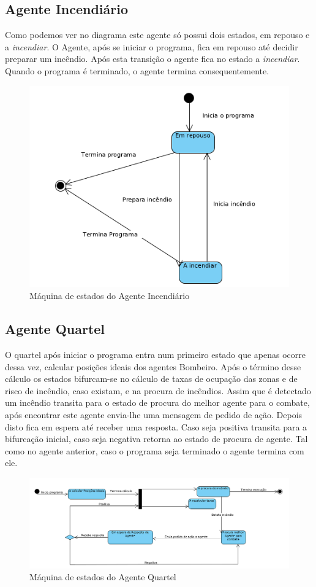 \documentclass[a4paper]{article}
\begin{document}
\subsection{Agente Incendiário}
Como podemos ver no diagrama este agente só possui dois estados, em repouso e a \textit{incendiar}. O Agente, após se iniciar o programa, fica em repouso até decidir preparar um incêndio. Após esta transição o agente fica no estado a \textit{incendiar}. Quando o programa é terminado, o agente termina consequentemente.
\begin{figure}[!h]
    \centering
    \includegraphics[scale=0.6]{incediario.png}
    \caption{Máquina de estados do Agente Incendiário}
\end{figure}


\subsection{Agente Quartel}
O quartel após iniciar o programa entra num primeiro estado que apenas ocorre dessa vez, calcular posições ideais dos agentes Bombeiro. Após o término desse cálculo os estados bifurcam-se no cálculo de taxas de ocupação das zonas e de risco de incêndio, caso existam, e na procura de incêndios. Assim que é detectado um incêndio transita para o estado de procura do melhor agente para o combate, após encontrar este agente envia-lhe uma mensagem de pedido de ação. Depois disto fica em espera até receber uma resposta. Caso seja positiva transita para a bifurcação inicial, caso seja negativa retorna ao estado de procura de agente. Tal como no agente anterior, caso o programa seja terminado o agente termina com ele.
\begin{figure}[H]
    \centering
    \includegraphics[scale=0.45]{AIQuartel.png}
    \caption{Máquina de estados do Agente Quartel}
\end{figure}
\end{document}
